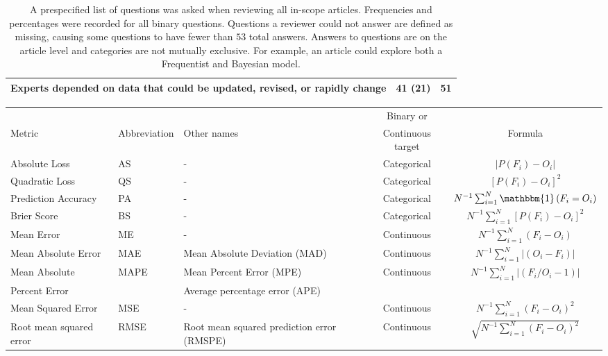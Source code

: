 \documentclass[preprint,authoryear]{elsarticle}
\def\l{\left}
\def\r{\right}
\begin{document}
\begin{table*}[ht!]
\begin{tabular}{ L{5.5cm}cc }
\\    
    Experts depended on data that could be updated, revised, or rapidly change  & 41 (21) & 51 \\
 \hline
  \end{tabular}
  \caption{
  A prespecified list of questions was asked when reviewing all in-scope articles.
  Frequencies and percentages were recorded for all binary questions.
  Questions a reviewer could not answer are defined as missing, causing some questions to have fewer than $53$ total answers.
  Answers to questions are on the article level and categories are not mutually exclusive.
  For example, an article could explore both a Frequentist and Bayesian model.
  \label{tbl.question}}
\end{table*}


\begin{sidewaystable}[ht!]
\begin{tabular}{L{4cm}C{3cm}C{4cm}cc}
    \hline
           &              &             & Binary or         &\\
    Metric & Abbreviation & Other names & Continuous target & Formula  \\
    \hline
    Absolute Loss  & AS                    & - & Categorical  &  $|P(F_{i}) - O_{i}|$\\
    Quadratic Loss & QS                    & - & Categorical  &  $\l[P(F_{i}) - O_{i}\r]^{2}$ \\
    Prediction Accuracy  & PA              & - & Categorical  &  $N^{-1} \sum_{i=1}^{N} \mathbbm{1}\l( F_{i} = O_{i} \r)$ \\
    Brier Score & BS                      & - & Categorical  &  $N^{-1} \sum_{i=1}^{N} \l[P(F_{i}) - O_{i}\r]^{2}$\\
    Mean Error & ME                       & - & Continuous   & $N^{-1} \sum_{i=1}^{N} (F_{i} - O_{i})$\\
    Mean Absolute Error & MAE             & Mean Absolute Deviation (MAD) & Continuous & $N^{-1} \sum_{i=1}^{N} |(O_{i} -F_{i} )|$\\
    Mean Absolute & MAPE    & Mean Percent Error (MPE)   & Continuous   & $N^{-1} \sum_{i=1}^{N} |(F_{i}/ O_{i} -1 )|$\\
    Percent Error                                       && Average percentage error (APE)\\
    Mean Squared Error & MSE              & - & Continuous & $N^{-1} \sum_{i=1}^{N} (F_{i} - O_{i})^{2}$ \\
    Root mean squared error & RMSE        & Root mean squared prediction error (RMSPE) & Continuous & $\sqrt{ N^{-1} \sum_{i=1}^{N} (F_{i} - O_{i})^{2}}$\\

\end{tabular}
\end{sidewaystable}
\end{document}
